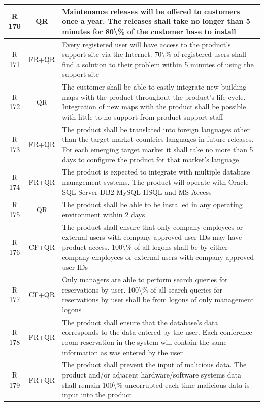 \documentclass[dissertation,final]{softeng}
\begin{document}
\begin{appendices}
{\begin{center}
\begin{longtable}{c c m{}}
    R 170   & QR & Maintenance releases will be offered to customers once a year. The releases shall take no longer than 5 minutes for 80\textbackslash{}\% of the customer base to install \\    \midrule
    R 171   & FR+QR & Every registered user will have access to the product's support site via the Internet. 70\textbackslash{}\% of registered users shall find a solution to their problem within 5 minutes of using the support site \\    \midrule
    R 172   & QR & The customer shall be able to easily integrate new building maps with the product throughout the product's life-cycle. Integration of new maps with the product shall be possible with little to no support from product support staff \\    \midrule
    R 173   & FR+QR & The product shall be translated into foreign languages other than the target market countries languages in future releases. For each emerging target market it shall take no more than 5 days to configure the product for that market's language \\    \midrule
    R 174   & FR+QR & The product is expected to integrate with multiple database management systems. The product will operate with Oracle SQL Server DB2 MySQL HSQL and MS Access \\    \midrule
    R 175   & QR & The product shall be able to be installed in any operating environment within 2 days \\    \midrule
    R 176   & CF+QR & The product shall ensure that only company employees or external users with company-approved user IDs may have product access. 100\textbackslash{}\% of all logons shall be by either company employees or external users with company-approved user IDs \\    \midrule
    R 177   & CF+QR & Only managers are able to perform search queries for reservations by user. 100\textbackslash{}\% of all search queries for reservations by user shall be from logons of only management logons \\    \midrule
    R 178   & FR+QR & The product shall ensure that the database's data corresponds to the data entered by the user. Each conference room reservation in the system will contain the same information as was entered by the user \\*    \midrule
    R 179   & FR+QR & The product shall prevent the input of malicious data. The product and/or adjacent hardware/software systems data shall remain 100\textbackslash{}\% uncorrupted each time malicious data is input into the product \\    \midrule

\end{longtable}
\end{center}}
\end{appendices}
\end{document}
